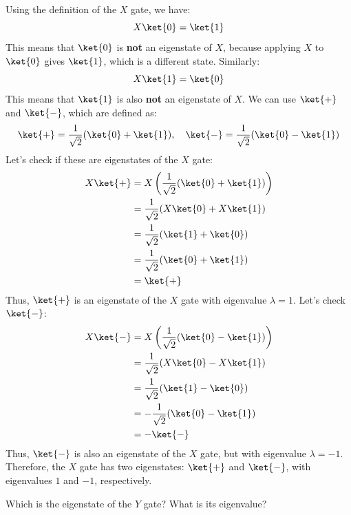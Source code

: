 \highspace
\solution Using the definition of the $X$ gate, we have:
\begin{equation*}
    X\ket{0} = \ket{1}
\end{equation*}
This means that $\ket{0}$ is \textbf{not} an eigenstate of $X$, because applying $X$ to $\ket{0}$ gives $\ket{1}$, which is a different state. Similarly:
\begin{equation*}
    X\ket{1} = \ket{0}
\end{equation*}
This means that $\ket{1}$ is also \textbf{not} an eigenstate of $X$. We can use $\ket{+}$ and $\ket{-}$, which are defined as:
\begin{equation*}
    \ket{+} = \frac{1}{\sqrt{2}}(\ket{0} + \ket{1}), \quad \ket{-} = \frac{1}{\sqrt{2}}(\ket{0} - \ket{1})
\end{equation*}
Let's check if these are eigenstates of the $X$ gate:
\begin{equation*}
    \begin{aligned}
        X\ket{+} &= X\left(\frac{1}{\sqrt{2}}(\ket{0} + \ket{1})\right) \\
        &= \frac{1}{\sqrt{2}}(X\ket{0} + X\ket{1}) \\
        &= \frac{1}{\sqrt{2}}(\ket{1} + \ket{0}) \\
        &= \frac{1}{\sqrt{2}}(\ket{0} + \ket{1}) \\
        &= \ket{+}
    \end{aligned}
\end{equation*}
Thus, $\ket{+}$ is an eigenstate of the $X$ gate with eigenvalue $\lambda = 1$. Let's check $\ket{-}$:
\begin{equation*}
    \begin{aligned}
        X\ket{-} &= X\left(\frac{1}{\sqrt{2}}(\ket{0} - \ket{1})\right) \\
        &= \frac{1}{\sqrt{2}}(X\ket{0} - X\ket{1}) \\
        &= \frac{1}{\sqrt{2}}(\ket{1} - \ket{0}) \\
        &= -\frac{1}{\sqrt{2}}(\ket{0} - \ket{1}) \\
        &= -\ket{-}
    \end{aligned}
\end{equation*}
Thus, $\ket{-}$ is also an eigenstate of the $X$ gate, but with eigenvalue $\lambda = -1$. Therefore, the $X$ gate has two eigenstates: $\ket{+}$ and $\ket{-}$, with eigenvalues $1$ and $-1$, respectively.

\highspace
\exercise Which is the eigenstate of the $Y$ gate? What is its eigenvalue?

